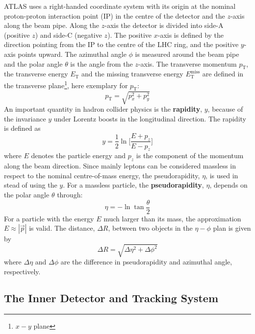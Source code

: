 ATLAS uses a right-handed coordinate system with its origin at the nominal proton-proton interaction point (IP) in the centre of the detector and the $z$-axis along the beam pipe.
Along the $z$-axis the detector is divided into side-A (positive $z$) and side-C (negative $z$).
The positive $x$-axis is defined by the direction pointing from the IP to the centre of the LHC ring, and the positive $y$-axis points upward.%
The azimuthal angle $\phi$ is measured around the beam pipe  and the polar angle $\theta$ is the angle from the $z$-axis.
The transverse momentum $p_{\mathrm{T}}$, the transverse energy $E_{\mathrm{T}}$ and the missing transverse
energy $E_{\mathrm{T}}^{\mathrm{miss}}$ are defined in the transverse plane\footnote{$x-y$ plane}, here exemplary for $p_{\mathrm{T}}$:
%
\begin{equation}
p_{\mathrm{T}}= \sqrt{p_{x}^{2} + p_{y}^{2}}
\end{equation}
%
An important quantity in hadron collider physics is the \textbf{rapidity}, $y$, because of the invariance $y$ under Lorentz boosts in the longitudinal direction.
The rapidity is defined as
%
\begin{equation}
y = \frac{1}{2} \ln\Big[\frac{E + p_{z}}{E - p_{z}}\Big]
\end{equation}
%
where $E$ denotes the particle energy and $p_{z}$  is the component of the momentum along the beam direction.
Since mainly leptons can be considered massless in respect to the nominal centre-of-mass energy, the pseudorapidity, $\eta$, is used in stead of using the $y$.
For a massless particle, the \textbf{pseudorapidity}, $\eta$, depends on the polar angle $\theta$ through:
%
\begin{equation}
\eta = - \ln \tan \frac{\theta}{2}
\end{equation}
%
For a particle with the energy $E$ much larger than its mass, the approximation $E \approx |\vec{p}|$ is valid.
The distance, $\Delta R$, between two objects in the $\eta-\phi$ plan is given by
%
\begin{equation}
\Delta R = \sqrt{\Delta \eta^{2} + \Delta \phi^{2}}
\end{equation}
%
where $\Delta \eta$ and $\Delta \phi$ are the difference in pseudorapidity and azimuthal angle, respectively.

\subsection{The Inner Detector and Tracking System}
\label{subsec:inner_detector}

